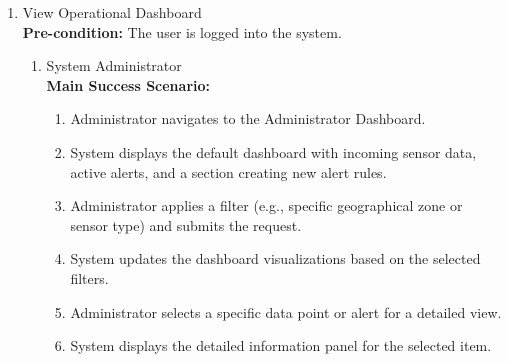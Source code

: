 {\begin{enumerate}[{\bf BE1.}]
	\item View Operational Dashboard \\
    {\bf Pre-condition:} The user is logged into the system.
    \begin{enumerate}[{\bf VP1.}]
        \item System Administrator \\
            {\bf Main Success Scenario:}
                \begin{enumerate}[1. ]
                    \item Administrator navigates to the Administrator Dashboard.
                    \item System displays the default dashboard with incoming sensor data, active alerts, and a section creating new alert rules.
                    \item Administrator applies a filter (e.g., specific geographical zone or sensor type) and submits the request.
                    \item System updates the dashboard visualizations based on the selected filters.
                    \item Administrator selects a specific data point or alert for a detailed view.
                    \item System displays the detailed information panel for the selected item.
                \end{enumerate}


\end{enumerate}
\end{enumerate}}
